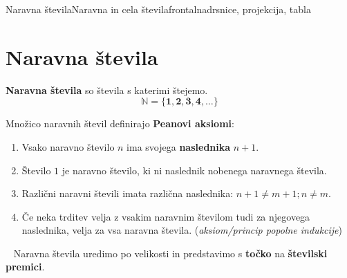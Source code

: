 \begin{priprava}{1}{}{Naravna števila}{Naravna in cela števila}{frontalna}{drsnice, projekcija, tabla}


    \section{Naravna števila}

    \textbf{Naravna števila} so števila s katerimi štejemo.
    $$\mathbf{\mathbb{N}=\{1, 2, 3, 4, \ldots\}}$$
 

  
    Množico naravnih števil definirajo \textbf{Peanovi aksiomi}:
    \begin{enumerate}
        \item Vsako naravno število $n$ ima svojega \textbf{naslednika} $n+1$.
        \item Število $1$ je naravno število, ki ni naslednik nobenega naravnega števila.
        \item Različni naravni števili imata različna naslednika: $n+1 \neq m+1; n \neq m$.
        \item Če neka trditev velja z vsakim naravnim številom tudi za njegovega naslednika, velja za vsa naravna števila. (\textit{aksiom/princip popolne indukcije})
    \end{enumerate}

 




    ~ \newline
Naravna števila uredimo po velikosti in predstavimo s \textbf{točko} na \textbf{številski premici}.
 \begin{figure}[H]
    \centering
\end{figure}
\end{priprava}
